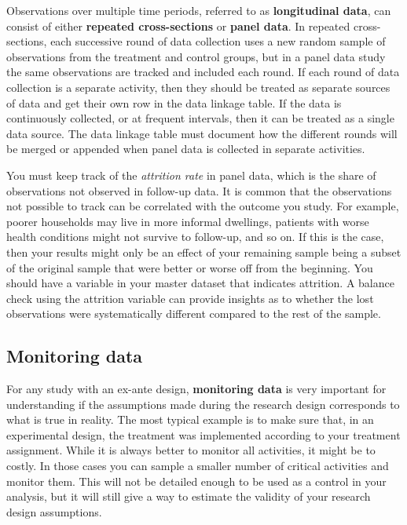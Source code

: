 Observations over multiple time periods, 
referred to as \textbf{longitudinal data},
can consist of either 
\textbf{repeated cross-sections}
or \textbf{panel data}.
In repeated cross-sections,
each successive round of data collection uses a new random sample
of observations from the treatment and control groups,
but in a panel data study
the same observations are tracked and included each round.
If each round of data collection is a separate activity,
then they should be treated as separate sources of data 
and get their own row in the data linkage table. 
If the data is continuously collected,
or at frequent intervals,
then it can be treated as a single data source.
The data linkage table must document 
how the different rounds will be merged or appended
when panel data is collected in separate activities.

You must keep track of the \textit{attrition rate} in panel data,
which is the share of observations not observed in follow-up data.
It is common that the observations not possible to track
can be correlated with the outcome you study.
For example, poorer households may live in more informal dwellings,
patients with worse health conditions might not survive to follow-up,
and so on.
If this is the case, 
then your results might only be an effect of your remaining sample
being a subset of the original sample 
that were better or worse off from the beginning.
You should have a variable in your master dataset
 that indicates attrition.
A balance check using the attrition variable
can provide insights as to whether the lost observations 
were systematically different
compared to the rest of the sample.

\subsection{Monitoring data}

For any study with an ex-ante design, 
\textbf{monitoring data}
is very important for understanding if the
assumptions made during the research design 
corresponds to what is true in reality.
The most typical example is to make sure that, 
in an experimental design,
the treatment was implemented according to your treatment assignment.
While it is always better to monitor all activities,
it might be to costly. 
In those cases you can sample a smaller number of critical activities and monitor them.
This will not be detailed enough to be used as a control in your analysis,
but it will still give a way to 
estimate the validity of your research design assumptions.


